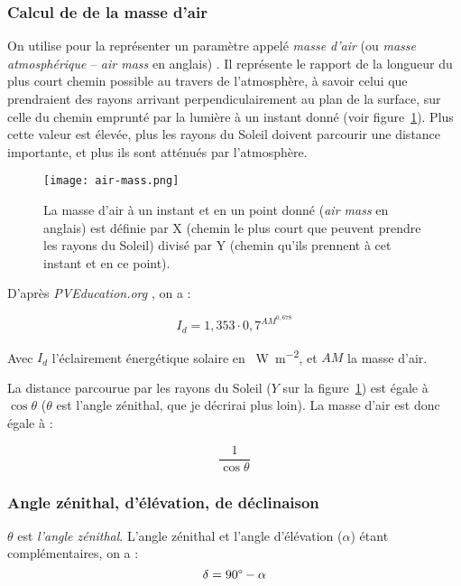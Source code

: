 \documentclass[12pt]{article}
\begin{document}
\subsubsection{Calcul de de la masse d'air}


On utilise pour la représenter un paramètre appelé \emph{masse d'air} (ou \emph{masse atmosphérique} -- \textit{air mass} en anglais) \cite{air_mass_wiki}.
Il représente le rapport de la longueur du plus court chemin possible au travers de l'atmosphère, à savoir celui que prendraient des rayons arrivant perpendiculairement au plan de la surface, sur celle du chemin emprunté par la lumière à un instant donné (voir figure~\ref{fig:air-mass}).
Plus cette valeur est élevée, plus les rayons du Soleil doivent parcourir une distance importante, et plus ils sont atténués par l'atmosphère.

\begin{figure}[H]
	\centerline{\texttt{[image: air-mass.png]}}
	\caption{La masse d'air à un instant et en un point donné (\textit{air mass} en anglais) est définie par X (chemin le plus court que peuvent prendre les rayons du Soleil) divisé par Y (chemin qu'ils prennent à cet instant et en ce point).} %
	\label{fig:air-mass}
\end{figure}



D'après \emph{PVEducation.org} \cite{pos_air_mass}, on a :

\[
	I_d = 1,353 \cdot 0,7^{{AM}^{0,678}}
\]

Avec $I_d$ l'éclairement énergétique solaire en \SI{}{\watt\per\square\meter}, et $AM$ la masse d'air.

La distance parcourue par les rayons du Soleil ($Y$ sur la figure~\ref{fig:air-mass}) est égale à $\cos \theta$ ($\theta$ est l'angle zénithal, que je décrirai plus loin).
La masse d'air est donc égale à :

\[\frac{1 }{\cos \theta}\]

\subsubsection{Angle zénithal, d'élévation, de déclinaison}
$\theta$ est \emph{l'angle zénithal}. L'angle zénithal et l'angle d'élévation ($\alpha$) étant complémentaires, on a :
\[
	\delta = 90\degree - \alpha
\]

\end{document}
